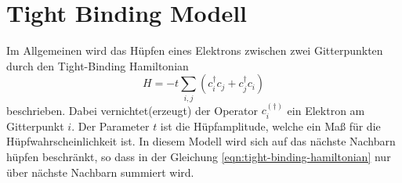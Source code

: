 \section{Tight Binding Modell}
\label{sec:tightbinding}
Im Allgemeinen wird das Hüpfen eines Elektrons zwischen zwei Gitterpunkten durch den Tight-Binding Hamiltonian 
\begin{equation}
    H = -t\sum_{i,j} \left ( c_i^\dagger c_j + c_j^\dagger c_i \right ) \label{eqn:tight-binding-hamiltonian}
\end{equation}
beschrieben. 
Dabei vernichtet(erzeugt) der Operator $c_i^{(\dagger)}$ ein Elektron am Gitterpunkt $i$.
Der Parameter $t$ ist die Hüpfamplitude, welche ein Maß für die Hüpfwahrscheinlichkeit ist.
In diesem Modell wird sich auf das nächste Nachbarn hüpfen beschränkt, so dass in der Gleichung \eqref{eqn:tight-binding-hamiltonian} nur über nächste 
Nachbarn summiert wird.